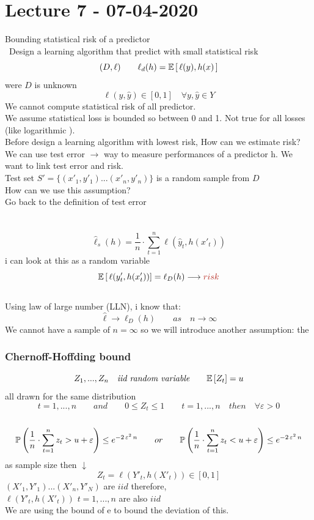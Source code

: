 \documentclass[../main.tex]{subfiles}
\begin{document}
\chapter{Lecture 7 - 07-04-2020}
Bounding statistical risk of a predictor\\\
Design a learning algorithm that predict with small statistical risk\\
$$
(D,\ell) \qquad \ell_d(h) = \mathbb{E}\left[ \, \ell (y), h(x) \, \right]
$$
were $D$ is unknown
$$
\ell(y, \hat{y}) \in [0,1] \quad \forall y, \hat{y} \in Y
$$
We cannot compute statistical risk of all predictor.\\
We assume statistical loss is bounded so between 0 and 1. Not true for all
losses (like logarithmic ).\\
Before design a learning algorithm with lowest risk, How can we estimate
risk?\\
We can use test error $\rightarrow$ way to measure performances of a predictor h.
We want to link test error and risk.
\\
Test set $S' = \{ (x'_1, y'_1) ...(x'_n,y'_n) \}$ is a random sample from $D$
\\
How can we use this assumption?\\
Go back to the definition of test error\\
\\
\\
$$
\hat{\ell}_s(h) = \frac{1}{n} \cdot \sum_{t=1}^{n} \ell (\hat{y}_t,h(x'_t))
$$
i can look at this as a random variable
\\
$$
\barra{E} \left[ \, \ell (y'_t, h(x'_t)) \right] = \ell_D(h) \longrightarrow \red{risk}
$$\\
Using law of large number (LLN), i know that:
$$
\hat{\ell} \longrightarrow \ell_D(h) \qquad as \quad n \rightarrow \infty
$$
We cannot have a sample of $n = \infty$ so we will introduce another assumption:
the \red{Chernoff-Hoffding bound}

\subsection{Chernoff-Hoffding bound}
$$
Z_1,...,Z_n \quad \textit{iid random variable} \qquad \mathbb{E}\left[Z_t \right] = u
$$
all drawn for the same distribution 
\\
$$
t = 1, ..., n \qquad and \qquad 0 \leq Z_t \leq 1 \qquad t = 1,...,n \quad then \quad \forall \varepsilon > 0
$$\
$$
\mathbb{P} \left( \frac{1}{n} \cdot \sum_{t=1}^{n} z_t > u + \varepsilon \right) \leq e^{-2 \, \varepsilon^2 \, n} \qquad  or \qquad \mathbb{P} \left( \frac{1}{n} \cdot \sum_{t=1}^{n} z_t < u + \varepsilon \right) \leq e^{-2 \, \varepsilon^2 \, n}
$$
as sample size then $\downarrow$
$$
Z_t = \ell(Y'_t, h(X'_t)) \in \left[0,1\right]
$$
$
(X'_1, Y'_1)...(X'_n, Y'_N)$ are $iid$ therefore, \\ $\ell\left(Y'_t, h\left(X'_t\right)\right)$ \quad $t = 1,...,n $ \quad are also $iid$
\\
We are using the bound of e to bound the deviation of this.
\end{document}
